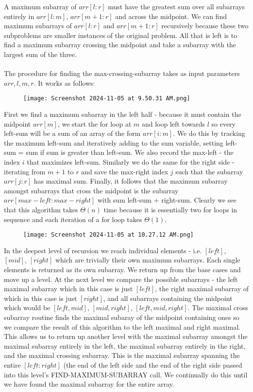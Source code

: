 \documentclass{scrartcl}
\theoremstyle{definition}
\theoremstyle{definition}
\theoremstyle{remark}
\numberwithin{equation}{section}
\begin{document}
A maximum subarray of $arr[l:r]$ must have the greatest sum over all subarrays entirely in $arr[l:m]$, $arr[m+1:r]$ and across the midpoint. We can find maximum subarrays of $arr[l:r]$ and $arr[m+1:r]$ recursively because these two subproblems are smaller instances of the original problem. All that is left is to find a maximum subarray crossing the midpoint and take a subarray with the largest sum of the three.\\
\\
The procedure for finding the max-crossing-subarray takes as input parameters $arr,l,m,r$. It works as follows:\\
\begin{figure}[h]
\centering
\texttt{[image: Screenshot 2024-11-05 at 9.50.31 AM.png]}
\end{figure}
First we find a maximum subarray in the left half - because it must contain the midpoint $arr[m]$, we start the for loop at $m$ and loop left towards $l$ so every left-sum will be a sum of an array of the form $arr[i:m]$. We do this by tracking the maximum left-sum and iteratively adding to the sum variable, setting left-sum = sum if sum is greater than left-sum. We also record the max-left - the index $i$ that maximizes left-sum. Similarly we do the same for the right side - iterating from $m+1$ to $r$ and save the max-right index $j$ such that the subarray $arr[j:r]$ has maximal sum. Finally, it follows that the maximum subarray amongst subarrays that cross the midpoint is the subarray $arr[max-left:max-right]$ with sum left-sum + right-sum. Clearly we see that this algorithm takes $\Theta(n)$ time because it is essentially two for loops in sequence and each iteration of a for loop takes $\Theta(1)$.
\begin{figure}[h]
\centering
\texttt{[image: Screenshot 2024-11-05 at 10.27.12 AM.png]}
\end{figure}
In the deepest level of recursion we reach individual elements - i.e. $[left]$, $[mid]$, $[right]$ which are trivially their own maximum subarrays. Each single elements is returned as its own subarray. We return up from the base cases and move up a level. At the next level we compare the possible subarrays - the left maximal subarray which in this case is just $[left]$, the right maximal subarray of which in this case is just $[right]$, and all subarrays containing the midpoint which would be $[left,mid]$, $[mid,right]$, $[left,mid,right]$. The maximal cross subarray routine finds the maximal subaray of the midpoint containing ones so we compare the result of this algorithm to the left maximal and right maximal. This allows us to return up another level with the maximal subarray amongst the maximal subarray entirely in the left, the maximal subarray entirely in the right, and the maximal crossing subarray. This is the maximal subarray spanning the entire $[left:right]$ (the end of the left side and the end of the right side passed into this level's FIND-MAXIMUM-SUBARRAY call. We continually do this until we have found the maximal subarray for the entire array.\\
\end{document}
